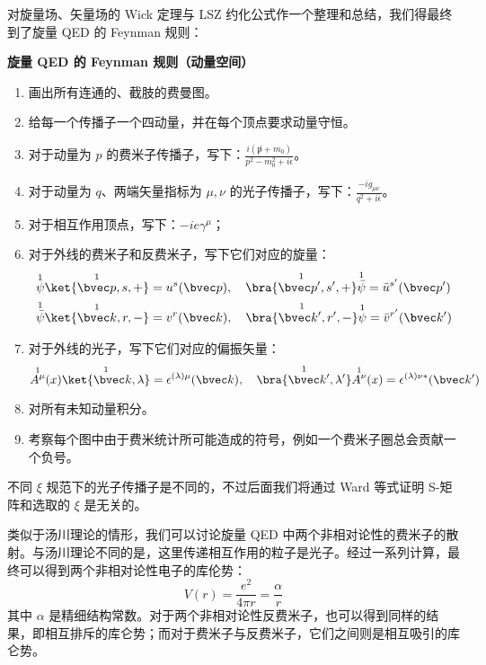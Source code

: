 
对旋量场、矢量场的 Wick 定理与 LSZ 约化公式作一个整理和总结，我们得最终到了旋量 QED 的 Feynman 规则：

\textbf{旋量 QED 的 Feynman 规则（动量空间）}
\begin{enumerate}
\item 画出所有连通的、截肢的费曼图。
\item 给每一个传播子一个四动量，并在每个顶点要求动量守恒。
\item 对于动量为 $p$ 的费米子传播子，写下：$\frac{i(\not p+m_0)}{p^2-m_0^2 + i\epsilon}$。
\item 对于动量为 $q$、两端矢量指标为 $\mu,\nu$ 的光子传播子，写下：$\frac{-ig_{\mu\nu}}{q^2 + i\epsilon}$。
\item 对于相互作用顶点，写下：$-ie\gamma^\mu$；
\item 对于外线的费米子和反费米子，写下它们对应的旋量：
\begin{align*}
&\overset{1}{\psi}\overset{1}{\ket{\bvec p,s,+}}=u^s(\bvec p),\quad \overset{1}{\bra{\bvec p',s',+}} \overset{1}{\bar\psi}=\bar u^{s'}(\bvec p')\\
&\overset{1}{\bar\psi}\overset{1}{\ket{\bvec k,r,-}}=v^{r}(\bvec k),\quad \overset{1}{\bra{\bvec k',r',-}} \overset{1}{\psi}=\bar v^{r'}(\bvec k')
\end{align*}
\item 对于外线的光子，写下它们对应的偏振矢量：
\[
\overset{1}{A^\mu}(x) \overset{1}{\ket{\bvec k,\lambda}}=\epsilon^{(\lambda)\mu}(\bvec k),\quad \overset{1}{\bra{\bvec k',\lambda'}}\overset{1}{A^\nu}(x)=\epsilon^{(\lambda)\nu*}(\bvec k')
\]
\item 
对所有未知动量积分。
\item 
考察每个图中由于费米统计所可能造成的符号，例如一个费米子圈总会贡献一个负号。
\end{enumerate}
不同 $\xi$ 规范下的光子传播子是不同的，不过后面我们将通过 Ward 等式证明 S-矩阵和选取的 $\xi$ 是无关的。

类似于汤川理论的情形，我们可以讨论旋量 QED 中两个非相对论性的费米子的散射。与汤川理论不同的是，这里传递相互作用的粒子是光子。经过一系列计算，最终可以得到两个非相对论性电子的库伦势：
\[
V(r)=\frac{e^2}{4\pi r}=\frac{\alpha}{r}
\]
其中 $\alpha$ 是精细结构常数。对于两个非相对论性反费米子，也可以得到同样的结果，即相互排斥的库仑势；而对于费米子与反费米子，它们之间则是相互吸引的库仑势。
